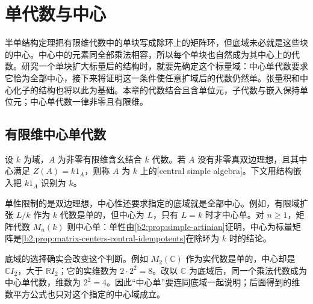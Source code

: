 
\section{单代数与中心}
\label{b2:sec:1701}

半单结构定理把有限维代数中的单块写成除环上的矩阵环，但底域未必就是这些块的中心。中心中的元素同全部乘法相容，所以每个单块也自然成为其中心上的代数。研究一个单块扩大标量后的结构时，就要先确定这个标量域：中心单代数要求它恰为全部中心，接下来将证明这一条件使任意扩域后的代数仍然单。张量积和中心化子的结构也将以此为基础。本章的代数结合且含单位元，子代数与嵌入保持单位元；中心单代数一律非零且有限维。

%
%

\subsection{有限维中心单代数}
\label{b2:subsec:1701:01}

\begin{definition}\label{b2:def:central-simple-algebra}
	设 \(k\) 为域，\(A\) 为非零有限维含幺结合 \(k\) 代数。若 \(A\) 没有非零真双边理想，且其中心满足 \(Z(A)=k1_A\)，则称 \(A\) 为 \(k\) 上的[central simple algebra]。下文用结构嵌入把 \(k1_A\) 识别为 \(k\)。
\end{definition}

单性限制的是双边理想，中心性还要求指定的底域就是全部中心。例如，有限域扩张 \(L/k\) 作为 \(k\) 代数是单的，但中心为 \(L\)，只有 \(L=k\) 时才中心单。对 \(n\ge1\)，矩阵代数 \(M_n(k)\) 则中心单：单性由\cref{b2:prop:simple-artinian}证明，中心为标量矩阵是\cref{b2:prop:matrix-centers-central-idempotents}在除环为 \(k\) 时的结论。

\ProseParagraphBreak
底域的选择确实会改变这个判断。例如 \(M_2(\mathbb C)\) 作为实代数是单的，中心却是 \(\mathbb C I_2\)，大于 \(\mathbb R I_2\)；它的实维数为 \(2\cdot2^2=8\)。改以 \(\mathbb C\) 为底域后，同一个乘法代数成为中心单代数，维数为 \(2^2=4\)。因此“中心单”要连同底域一起说明；后面得到的维数平方公式也只对这个指定的中心域成立。

